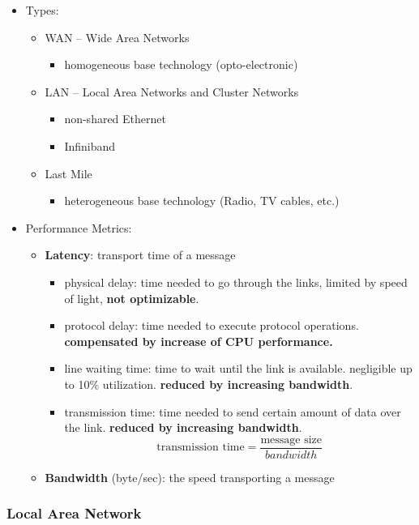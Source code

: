 \begin{itemize}
	\item Types:
	\begin{itemize}
		\item WAN -- Wide Area Networks
		\begin{itemize}
			\item homogeneous base technology (opto-electronic)
		\end{itemize}
		
		\item LAN -- Local Area Networks and Cluster Networks
		\begin{itemize}
			\item non-shared Ethernet
			\item Infiniband
		\end{itemize}
		
		\item Last Mile
		\begin{itemize}
			\item heterogeneous base technology (Radio, TV cables, etc.)
		\end{itemize}
	\end{itemize}

	\item Performance Metrics:
	\begin{itemize}
		\item \textbf{Latency}: transport time of a message
		\begin{itemize}
			\item physical delay: time needed to go through the links, limited by speed of light, \textbf{not optimizable}.
			\item protocol delay: time needed to execute protocol operations. \textbf{compensated by increase of CPU performance.}
			\item line waiting time: time to wait until the link is available. negligible up to 10\% utilization. \textbf{reduced by increasing bandwidth}.
			\item transmission time: time needed to send certain amount of data over the link. \textbf{reduced by increasing bandwidth}.
			$$\text{transmission time} = \frac{\text{message size}}{bandwidth}$$
		\end{itemize}
		\item \textbf{Bandwidth} (byte/sec): the speed transporting a message
	\end{itemize}
\end{itemize}


\subsubsection{Local Area Network}
